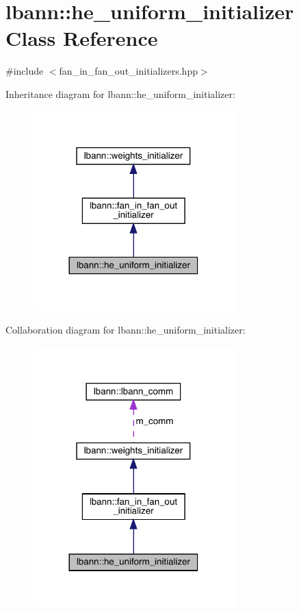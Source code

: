 \hypertarget{classlbann_1_1he__uniform__initializer}{}\section{lbann\+:\+:he\+\_\+uniform\+\_\+initializer Class Reference}
\label{classlbann_1_1he__uniform__initializer}


{\ttfamily \#include $<$fan\+\_\+in\+\_\+fan\+\_\+out\+\_\+initializers.\+hpp$>$}



Inheritance diagram for lbann\+:\+:he\+\_\+uniform\+\_\+initializer\+:\nopagebreak
\begin{figure}[H]
\begin{center}
\leavevmode
\includegraphics[width=221pt]{classlbann_1_1he__uniform__initializer__inherit__graph}
\end{center}
\end{figure}


Collaboration diagram for lbann\+:\+:he\+\_\+uniform\+\_\+initializer\+:\nopagebreak
\begin{figure}[H]
\begin{center}
\leavevmode
\includegraphics[width=221pt]{classlbann_1_1he__uniform__initializer__coll__graph}
\end{center}
\end{figure}
